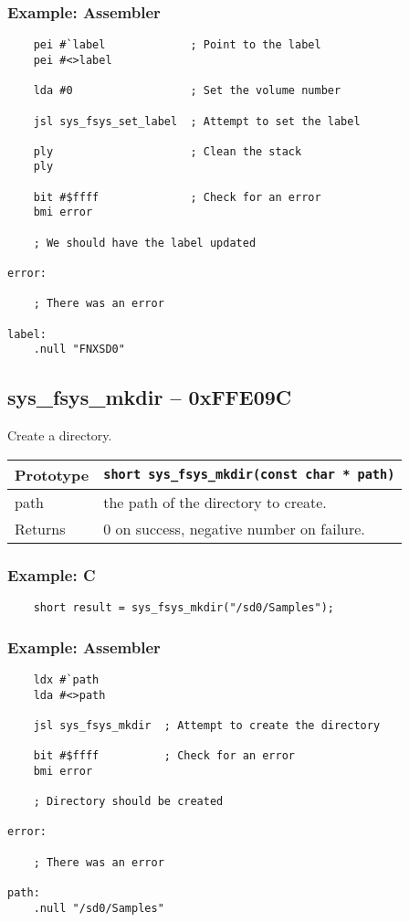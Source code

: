 \subsubsection*{Example: Assembler}
\begin{verbatim}
    pei #`label             ; Point to the label
    pei #<>label

    lda #0                  ; Set the volume number

    jsl sys_fsys_set_label  ; Attempt to set the label

    ply                     ; Clean the stack
    ply

    bit #$ffff              ; Check for an error
    bmi error

    ; We should have the label updated

error:

    ; There was an error

label:
    .null "FNXSD0"
\end{verbatim}

\subsection*{sys\_fsys\_mkdir -- 0xFFE09C}
Create a directory.

\bigskip

\begin{tabular}{|l||l|} \hline
Prototype & \lstinline!short sys_fsys_mkdir(const char * path)! \\ \hline
path & the path of the directory to create. \\ \hline
Returns & 0 on success, negative number on failure. \\ \hline
\end{tabular}

\subsubsection*{Example: C}
\begin{lstlisting}
    short result = sys_fsys_mkdir("/sd0/Samples");
\end{lstlisting}

\subsubsection*{Example: Assembler}
\begin{verbatim}
    ldx #`path
    lda #<>path

    jsl sys_fsys_mkdir  ; Attempt to create the directory

    bit #$ffff          ; Check for an error
    bmi error

    ; Directory should be created

error:

    ; There was an error

path:
    .null "/sd0/Samples"
\end{verbatim}


